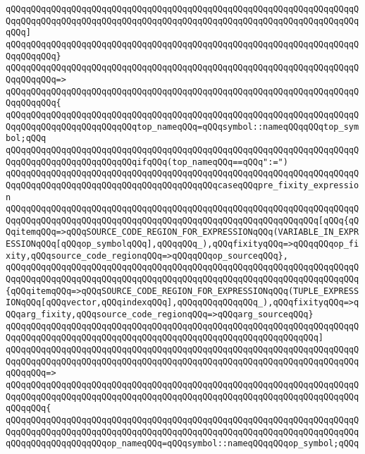 \verb|qQQqqQQqqQQqqQQqqQQqqQQqqQQqqQQqqQQqqQQqqQQqqQQqqQQqqQQqqQQqqQQqqQQqqQQqqQQqqQQqqQQqqQQqqQQqqQQqqQQqqQQqqQQqqQQqqQQqqQQqqQQqqQQqqQQqqQQqqQQqqQQq]|\newline
\verb|qQQqqQQqqQQqqQQqqQQqqQQqqQQqqQQqqQQqqQQqqQQqqQQqqQQqqQQqqQQqqQQqqQQqqQQqqQQqqQQq}|\newline
\verb|qQQqqQQqqQQqqQQqqQQqqQQqqQQqqQQqqQQqqQQqqQQqqQQqqQQqqQQqqQQqqQQqqQQqqQQqqQQqqQQq=>|\newline
\verb|qQQqqQQqqQQqqQQqqQQqqQQqqQQqqQQqqQQqqQQqqQQqqQQqqQQqqQQqqQQqqQQqqQQqqQQqqQQqqQQq{|\newline
\verb|qQQqqQQqqQQqqQQqqQQqqQQqqQQqqQQqqQQqqQQqqQQqqQQqqQQqqQQqqQQqqQQqqQQqqQQqqQQqqQQqqQQqqQQqqQQqqQQqtop_nameqQQq=qQQqsymbol::nameqQQqqQQqtop_symbol;qQQq|\newline
\verb|qQQqqQQqqQQqqQQqqQQqqQQqqQQqqQQqqQQqqQQqqQQqqQQqqQQqqQQqqQQqqQQqqQQqqQQqqQQqqQQqqQQqqQQqqQQqqQQqifqQQq(top_nameqQQq==qQQq":=")|\newline
\verb|qQQqqQQqqQQqqQQqqQQqqQQqqQQqqQQqqQQqqQQqqQQqqQQqqQQqqQQqqQQqqQQqqQQqqQQqqQQqqQQqqQQqqQQqqQQqqQQqqQQqqQQqqQQqqQQqcaseqQQqpre_fixity_expression|\newline
\verb|qQQqqQQqqQQqqQQqqQQqqQQqqQQqqQQqqQQqqQQqqQQqqQQqqQQqqQQqqQQqqQQqqQQqqQQqqQQqqQQqqQQqqQQqqQQqqQQqqQQqqQQqqQQqqQQqqQQqqQQqqQQqqQQqqQQq[qQQq{qQQqitemqQQq=>qQQqSOURCE_CODE_REGION_FOR_EXPRESSIONqQQq(VARIABLE_IN_EXPRESSIONqQQq[qQQqop_symbolqQQq],qQQqqQQq_),qQQqfixityqQQq=>qQQqqQQqop_fixity,qQQqsource_code_regionqQQq=>qQQqqQQqop_sourceqQQq},|\newline
\verb|qQQqqQQqqQQqqQQqqQQqqQQqqQQqqQQqqQQqqQQqqQQqqQQqqQQqqQQqqQQqqQQqqQQqqQQqqQQqqQQqqQQqqQQqqQQqqQQqqQQqqQQqqQQqqQQqqQQqqQQqqQQqqQQqqQQqqQQqqQQq{qQQqitemqQQq=>qQQqSOURCE_CODE_REGION_FOR_EXPRESSIONqQQq(TUPLE_EXPRESSIONqQQq[qQQqvector,qQQqindexqQQq],qQQqqQQqqQQqqQQq_),qQQqfixityqQQq=>qQQqarg_fixity,qQQqsource_code_regionqQQq=>qQQqarg_sourceqQQq}|\newline
\verb|qQQqqQQqqQQqqQQqqQQqqQQqqQQqqQQqqQQqqQQqqQQqqQQqqQQqqQQqqQQqqQQqqQQqqQQqqQQqqQQqqQQqqQQqqQQqqQQqqQQqqQQqqQQqqQQqqQQqqQQqqQQqqQQqqQQq]|\newline
\verb|qQQqqQQqqQQqqQQqqQQqqQQqqQQqqQQqqQQqqQQqqQQqqQQqqQQqqQQqqQQqqQQqqQQqqQQqqQQqqQQqqQQqqQQqqQQqqQQqqQQqqQQqqQQqqQQqqQQqqQQqqQQqqQQqqQQqqQQqqQQqqQQqqQQq=>|\newline
\verb|qQQqqQQqqQQqqQQqqQQqqQQqqQQqqQQqqQQqqQQqqQQqqQQqqQQqqQQqqQQqqQQqqQQqqQQqqQQqqQQqqQQqqQQqqQQqqQQqqQQqqQQqqQQqqQQqqQQqqQQqqQQqqQQqqQQqqQQqqQQqqQQqqQQq{|\newline
\verb|qQQqqQQqqQQqqQQqqQQqqQQqqQQqqQQqqQQqqQQqqQQqqQQqqQQqqQQqqQQqqQQqqQQqqQQqqQQqqQQqqQQqqQQqqQQqqQQqqQQqqQQqqQQqqQQqqQQqqQQqqQQqqQQqqQQqqQQqqQQqqQQqqQQqqQQqqQQqqQQqop_nameqQQq=qQQqsymbol::nameqQQqqQQqop_symbol;qQQq|\newline
